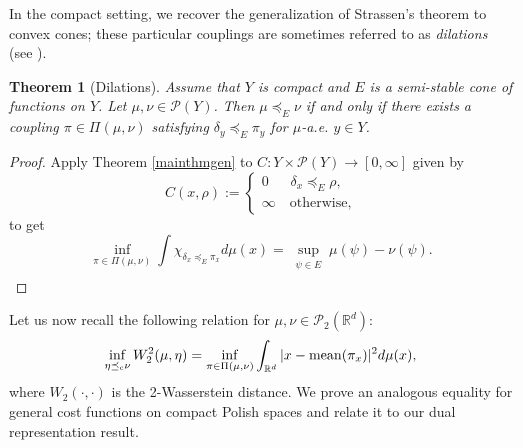 \documentclass[reqno, a4paper]{amsart}
\newcommand{\lc}{\preceq_{\textnormal{c}}}
\newcommand{\ld}{\preceq_{E}}
\newtheorem{theorem}{Theorem}[section]
\newcommand{\PP}{\mathcal{P}}
\newcommand{\cP}{\mathcal{P}}
\renewcommand{\P}{\cP}
\newcommand{\R}{\mathbb R}
\theoremstyle{definition}
\theoremstyle{definition}
\theoremstyle{definition}
\newcommand{\mean}{\mathrm{mean}}
\begin{document}

In the compact setting, we  recover the generalization of Strassen's theorem to convex cones; these particular couplings are sometimes referred to as \textit{dilations} (see \cite[Theorem 19.40]{aliprantis2007infinite}).

\begin{theorem}[Dilations]\label{dil} Assume that $Y$ is compact and  $E$ is a semi-stable cone of functions on $Y$. Let $\mu,\nu\in\PP(Y)$. Then $\mu\ld\nu$ if and only if there exists a coupling $\pi\in\Pi(\mu,\nu)$ satisfying $\delta_y \ld\pi_y$ for $\mu$-a.e. $y\in Y$.
\end{theorem}

\begin{proof}
    Apply Theorem \ref{mainthmgen} to $C:Y\times\P(Y)\to[0,\infty]$ given by $$C(x,\rho):=\begin{cases}
        0 \quad\;\; \delta_x \ld\rho,\\
        \infty \quad \text{otherwise,}
    \end{cases}$$
to get
$$\inf_{\pi\in\Pi(\mu,\nu)} \int \chi_{\delta_x\ld\pi_x}d\mu(x)= \sup_{\substack{\psi \in E \\ }} \mu(\psi) - \nu(\psi).$$
\end{proof}

Let us now recall the following relation for $\mu,\nu\in\P_2(\R^d)$:
$$\inf_{\eta\lc\nu} W^2_2(\mu,\eta)= \inf_{\pi\in\Pi(\mu,\nu)} \int_{\R^d} |x-\mean(\pi_x)|^2 d\mu(x),$$
where $W_2(\cdot,\cdot)$ is the 2-Wasserstein distance.
We prove an analogous equality for general cost functions on compact Polish spaces and relate it to our dual representation result.
\end{document}
